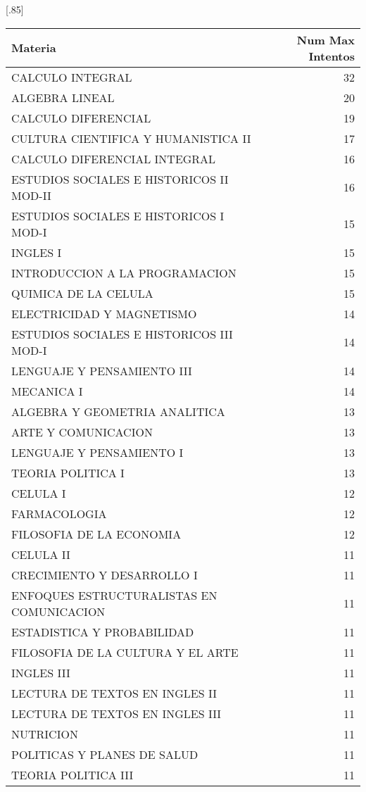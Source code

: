 \documentclass[12pt]{article}
\begin{document}
\begin{table}[ht]
\centering
\scalebox{0.75}[.85]{
\begin{tabular}{lr}
  \hline
  Materia & Num Max Intentos\\ 
  \hline
  CALCULO INTEGRAL & 32 \\ 
  ALGEBRA LINEAL & 20 \\ 
  CALCULO DIFERENCIAL & 19 \\ 
  CULTURA CIENTIFICA Y HUMANISTICA II & 17 \\ 
  CALCULO DIFERENCIAL INTEGRAL & 16 \\ 
  ESTUDIOS SOCIALES E HISTORICOS II MOD-II & 16 \\ 
  ESTUDIOS SOCIALES E HISTORICOS I MOD-I & 15 \\ 
  INGLES I & 15 \\ 
  INTRODUCCION A LA PROGRAMACION & 15 \\ 
  QUIMICA DE LA CELULA & 15 \\ 
  ELECTRICIDAD Y MAGNETISMO & 14 \\ 
  ESTUDIOS SOCIALES E HISTORICOS III MOD-I & 14 \\ 
  LENGUAJE Y PENSAMIENTO III & 14 \\ 
  MECANICA I & 14 \\ 
  ALGEBRA Y GEOMETRIA ANALITICA & 13 \\ 
  ARTE Y COMUNICACION & 13 \\ 
  LENGUAJE Y PENSAMIENTO I & 13 \\ 
  TEORIA POLITICA I & 13 \\ 
  CELULA I & 12 \\ 
  FARMACOLOGIA & 12 \\ 
  FILOSOFIA DE LA ECONOMIA & 12 \\ 
  CELULA II & 11 \\ 
  CRECIMIENTO Y DESARROLLO I & 11 \\ 
  ENFOQUES ESTRUCTURALISTAS EN COMUNICACION & 11 \\ 
  ESTADISTICA Y PROBABILIDAD & 11 \\ 
  FILOSOFIA DE LA CULTURA Y EL ARTE & 11 \\ 
  INGLES III & 11 \\ 
  LECTURA DE TEXTOS EN INGLES II & 11 \\ 
  LECTURA DE TEXTOS EN INGLES III & 11 \\ 
  NUTRICION & 11 \\ 
  POLITICAS Y PLANES DE SALUD & 11 \\ 
  TEORIA POLITICA III & 11 \\ 
   \hline
\end{tabular}}
\end{table}
\end{document}
